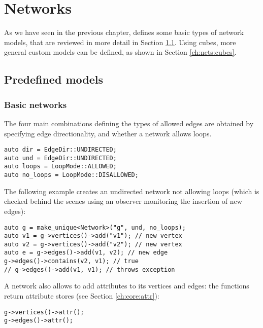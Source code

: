 \chapter{Networks}

As we have seen in the previous chapter,  defines some basic types of network models, that are reviewed in more detail in Section \ref{ch:nets:basic}. Using cubes, more general custom models can be defined, as shown in Section \ref{ch:nets:cubes}.

\section{Predefined models} \label{ch:nets:basic}

\subsection{Basic networks}

The four main combinations defining the types of allowed edges are obtained by specifying edge directionality, and whether a network allows loops.
\begin{lstlisting}[style=c++]
auto dir = EdgeDir::UNDIRECTED;
auto und = EdgeDir::UNDIRECTED;
auto loops = LoopMode::ALLOWED;
auto no_loops = LoopMode::DISALLOWED;
\end{lstlisting}
    
The following example creates an undirected network not allowing loops (which is checked behind the scenes using an observer monitoring the insertion of new edges):
\begin{lstlisting}[style=c++]
auto g = make_unique<Network>("g", und, no_loops);
auto v1 = g->vertices()->add("v1"); // new vertex
auto v2 = g->vertices()->add("v2"); // new vertex
auto e = g->edges()->add(v1, v2); // new edge
g->edges()->contains(v2, v1); // true
// g->edges()->add(v1, v1); // throws exception
\end{lstlisting}
A network also allows to add attributes to its vertices and edges: the  functions return attribute stores (see Section \ref{ch:core:attr}):
\begin{lstlisting}[style=c++]
g->vertices()->attr();
g->edges()->attr();
\end{lstlisting}

